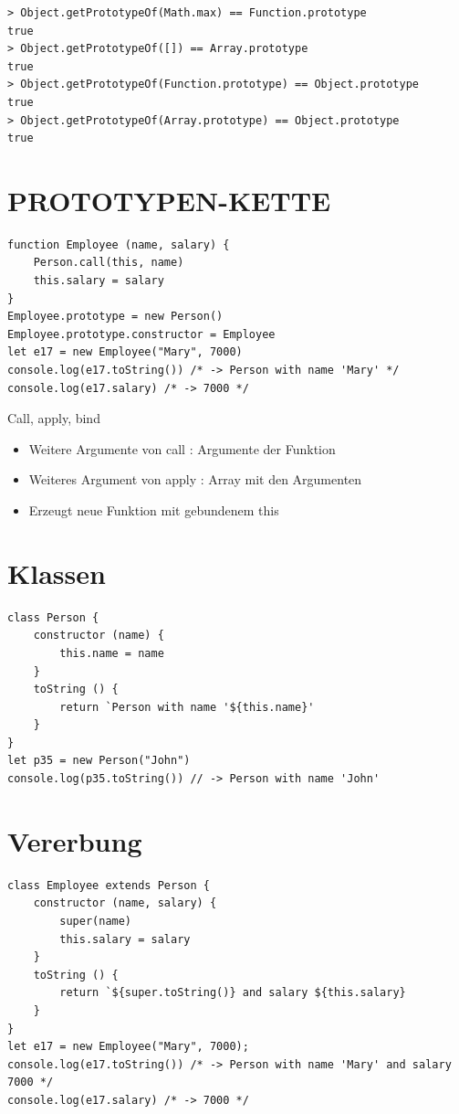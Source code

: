 \documentclass[10pt]{article}
\begin{document}
\begin{verbatim}
> Object.getPrototypeOf(Math.max) == Function.prototype
true
> Object.getPrototypeOf([]) == Array.prototype
true
> Object.getPrototypeOf(Function.prototype) == Object.prototype
true
> Object.getPrototypeOf(Array.prototype) == Object.prototype
true
\end{verbatim}

\section*{PROTOTYPEN-KETTE}
\begin{verbatim}
function Employee (name, salary) {
    Person.call(this, name)
    this.salary = salary
}
Employee.prototype = new Person()
Employee.prototype.constructor = Employee
let e17 = new Employee("Mary", 7000)
console.log(e17.toString()) /* -> Person with name 'Mary' */
console.log(e17.salary) /* -> 7000 */
\end{verbatim}

Call, apply, bind

\begin{itemize}
  \item Weitere Argumente von call : Argumente der Funktion
  \item Weiteres Argument von apply : Array mit den Argumenten
  \item Erzeugt neue Funktion mit gebundenem this
\end{itemize}

\section*{Klassen}
\begin{verbatim}
class Person {
    constructor (name) {
        this.name = name
    }
    toString () {
        return `Person with name '${this.name}'
    }
}
let p35 = new Person("John")
console.log(p35.toString()) // -> Person with name 'John'
\end{verbatim}

\section*{Vererbung}
\begin{verbatim}
class Employee extends Person {
    constructor (name, salary) {
        super(name)
        this.salary = salary
    }
    toString () {
        return `${super.toString()} and salary ${this.salary}
    }
}
let e17 = new Employee("Mary", 7000);
console.log(e17.toString()) /* -> Person with name 'Mary' and salary 7000 */
console.log(e17.salary) /* -> 7000 */
\end{verbatim}
\end{document}
